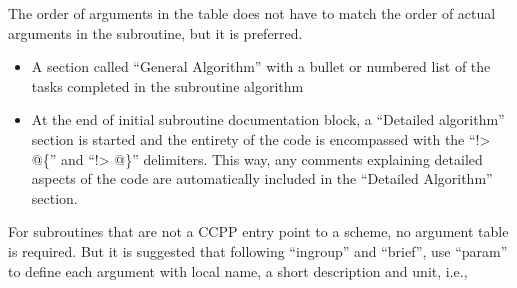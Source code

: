 \documentclass[letterpaper,10pt,english]{sphinxmanual}
\begin{document}
The order of arguments in the table does not have to match the order of actual
arguments in the subroutine, but it is preferred.
\begin{itemize}
\item {} 
A section called “General Algorithm” with a bullet or numbered list of
the tasks completed in the subroutine algorithm

\item {} 
At the end of initial subroutine documentation block, a “Detailed algorithm”
section is started and the entirety of the code  is encompassed with the
“!\textgreater{} @\{” and “!\textgreater{} @\}” delimiters. This way, any comments explaining detailed
aspects of the code are automatically included in the “Detailed Algorithm” section.

\end{itemize}

For subroutines that are not a CCPP entry point to a scheme, no argument table
is required. But it is suggested that following “ingroup” and “brief”, use
“param” to define each argument with local name, a short description and unit, i.e.,

\begin{sphinxVerbatim}[commandchars=\\\{\}]
\end{sphinxVerbatim}
\end{document}
